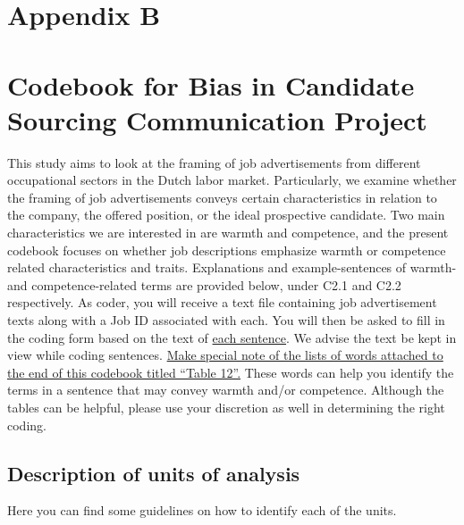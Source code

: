 \documentclass[jou]{apa7}
\begin{document}
\newpage
\section{Appendix B}
\label{appendix_b}

\section{Codebook for Bias in Candidate Sourcing Communication Project}
\label{codebook}
This study aims to look at the framing of job advertisements from different occupational sectors in the Dutch labor market. Particularly, we examine whether the framing of job advertisements conveys certain characteristics in relation to the company, the offered position, or the ideal prospective candidate. Two main characteristics we are interested in are warmth and competence, and the present codebook focuses on whether job descriptions emphasize warmth or competence related characteristics and traits. Explanations and example-sentences of warmth- and competence-related terms are provided below, under C2.1 and C2.2 respectively.
As coder, you will receive a text file containing job advertisement texts along with a Job ID associated with each. You will then be asked to fill in the coding form based on the text of \uline{each sentence}. We advise the text be kept in view while coding sentences.
\uline{Make special note of the lists of words attached to the end of this codebook titled “Table 12”.} These words can help you identify the terms in a sentence that may convey warmth and/or competence. Although the tables can be helpful, please use your discretion as well in determining the right coding.

\subsection{Description of units of analysis}
\label{description_of_units_of_analysis}
Here you can find some guidelines on how to identify each of the units.
\end{document}
